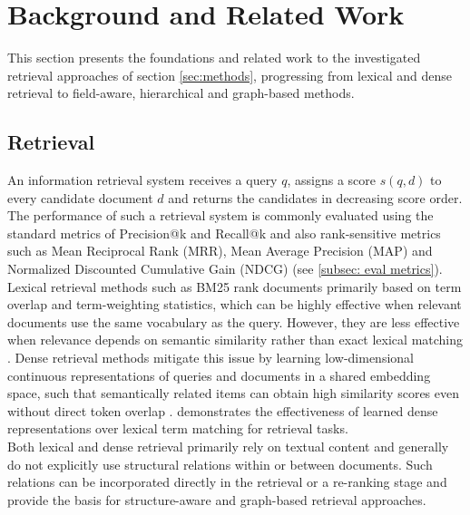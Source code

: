 \documentclass[11pt]{article}
\begin{document}
\section{Background and Related Work}
This section presents the foundations and related work to the investigated retrieval approaches of section \ref{sec:methods}, progressing from lexical and dense retrieval to field-aware, hierarchical and graph-based methods.
 
\subsection{Retrieval}
An information retrieval system receives a query \(q\), assigns a score \(s(q,d)\) to every candidate document \(d\) and returns the candidates in decreasing score order. The performance of such a retrieval system is commonly evaluated using the standard metrics of Precision@k and Recall@k and also rank-sensitive metrics such as Mean Reciprocal Rank (MRR), Mean Average Precision (MAP) and Normalized Discounted Cumulative Gain (NDCG) (see \ref{subsec: eval metrics}).\\
Lexical retrieval methods such as BM25 rank documents primarily based on term overlap and term-weighting statistics, which can be highly effective when relevant documents use the same vocabulary as the query. However, they are less effective when relevance depends on semantic similarity rather than exact lexical matching \cite{robertson_probabilistic_framework_bm25_beyond, karpukhin_dense_2020}. Dense retrieval methods mitigate this issue by learning low-dimensional continuous representations of queries and documents in a shared embedding space, such that semantically related items can obtain high similarity scores even without direct token overlap \cite{karpukhin_dense_2020}. \citet{reimers-2019-sentence-bert} demonstrates the effectiveness of learned dense representations over lexical term matching for retrieval tasks.\\
Both lexical and dense retrieval primarily rely on textual content and generally do not explicitly use structural relations within or between documents. Such relations can be incorporated directly in the retrieval or a re-ranking stage and provide the basis for structure-aware and graph-based retrieval approaches.
\end{document}
